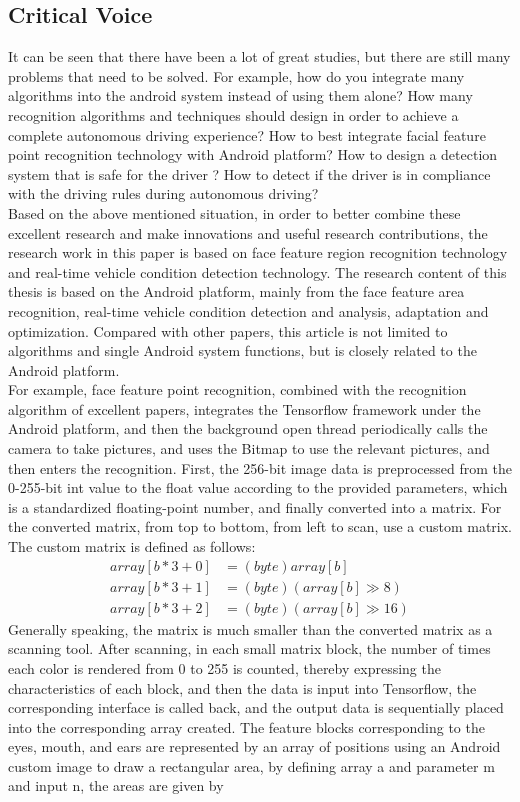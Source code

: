 \documentclass[12pt, a4paper]{article}
\begin{document}
\subsection{Critical Voice}
It can be seen that there have been a lot of great studies, but there are still many problems that need to be solved. For example, how do you integrate many algorithms into the android system instead of using them alone? How many recognition algorithms and techniques should design in order to achieve a complete autonomous driving experience? How to best integrate facial feature point recognition technology with Android platform? How to design a detection system that is safe for the driver \cite{yee}? How to detect if the driver is in compliance with the driving rules during autonomous driving?\\
Based on the above mentioned situation, in order to better combine these excellent research and make innovations and useful research contributions, the research work in this paper is based on face feature region recognition technology and real-time vehicle condition detection technology. The research content of this thesis is based on the Android platform, mainly from the face feature area recognition, real-time vehicle condition detection and analysis, adaptation and optimization. Compared with other papers, this article is not limited to algorithms and single Android system functions, but is closely related to the Android platform.\\
For example, face feature point recognition, combined with the recognition algorithm of excellent papers, integrates the Tensorflow framework under the Android platform, and then the background open thread periodically calls the camera to take pictures, and uses the Bitmap to use the relevant pictures, and then enters the recognition. First, the 256-bit image data is preprocessed from the 0-255-bit int value to the float value according to the provided parameters, which is a standardized floating-point number, and finally converted into a matrix. For the converted matrix, from top to bottom, from left to scan, use a custom matrix. The custom matrix is defined as follows:
\begin{align}
  array[b \ast 3 + 0] &= (byte)array[b]\\
  array[b \ast 3 + 1] &= (byte)(array\left[b\right] \gg 8)\\
  array[b \ast 3 + 2] &= (byte)(array[b] \gg 16)
\end{align} 
Generally speaking, the matrix is ​​much smaller than the converted matrix as a scanning tool. After scanning, in each small matrix block, the number of times each color is rendered from 0 to 255 is counted, thereby expressing the characteristics of each block, and then the data is input into Tensorflow, the corresponding interface is called back, and the output data is sequentially placed into the corresponding array created. The feature blocks corresponding to the eyes, mouth, and ears are represented by an array of positions using an Android custom image to draw a rectangular area, by defining array a and parameter m and input n, the areas are given by
\end{document}
